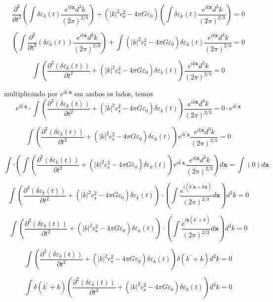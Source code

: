 \documentclass[a4paper,12pt]{article}
\begin{document}
$$\dfrac{\partial^2 }{\partial t^2} \left(\int \delta\varepsilon_k (t)  \dfrac{e^{ik\textbf{x}}d^3 k}{(2\pi)^{2/3}} \right) + (|k|^2c^2_s - 4\pi G\varepsilon_0)  \left(\int \delta\varepsilon_k (t)  \dfrac{e^{ik\textbf{x}}d^3 k}{(2\pi)^{2/3}} \right) = 0$$

$$ \left(\int \dfrac{\partial^2 }{\partial t^2}( \delta\varepsilon_k (t))  \dfrac{e^{ik\textbf{x}}d^3 k}{(2\pi)^{2/3}} \right) + \int (|k|^2c^2_s - 4\pi G\varepsilon_0)\delta\varepsilon_k (t) \dfrac{ e^{ik\textbf{x}}d^3 k}{(2\pi)^{2/3}} = 0$$

$$ \int \left(\dfrac{\partial^2 (\delta\varepsilon_k (t))}{\partial t^2} +(|k|^2c^2_s - 4\pi G\varepsilon_0)\delta\varepsilon_k (t)\right)  \dfrac{e^{ik\textbf{x}}d^3 k}{(2\pi)^{2/3}} = 0$$

multiplicando por $e^{i k^\prime \textbf{x}}$ em ambos os lados, temos
$$ e^{i k^\prime \textbf{x}} \cdot \int \left(\dfrac{\partial^2 (\delta\varepsilon_k (t))}{\partial t^2} +(|k|^2c^2_s - 4\pi G\varepsilon_0)\delta\varepsilon_k (t)\right)\dfrac{e^{ik\textbf{x}}d^3 k}{(2\pi)^{2/3}} = 0 \cdot  e^{i k^\prime \textbf{x}}$$

$$ \int \left(\dfrac{\partial^2 (\delta\varepsilon_k (t))}{\partial t^2} +(|k|^2c^2_s - 4\pi G\varepsilon_0)\delta\varepsilon_k (t)\right) e^{i k^\prime \textbf{x}}  \dfrac{e^{ik\textbf{x}}d^3 k}{(2\pi)^{2/3}} = 0$$

$$ \int \cdot \left(\int \left(\dfrac{\partial^2 (\delta\varepsilon_k (t))}{\partial t^2} +(|k|^2c^2_s - 4\pi G\varepsilon_0)\delta\varepsilon_k (t)\right) e^{i k^\prime \textbf{x}}  \dfrac{e^{ik\textbf{x}}d^3 k}{(2\pi)^{2/3}}\right) d\textbf{x} =\int \left( 0 \right) d\textbf{x}$$

$$  \int \left(\dfrac{\partial^2 (\delta\varepsilon_k (t))}{\partial t^2} +(|k|^2c^2_s - 4\pi G\varepsilon_0)\delta\varepsilon_k (t)\right)\cdot \left(\int \dfrac{e^{ i (k^\prime \textbf{x} +  k\textbf{x}) }}{(2\pi)^{2/3}}d\textbf{x}\right) d^3k   =0$$

$$ \int \left(\dfrac{\partial^2 (\delta\varepsilon_k (t))}{\partial t^2} +(|k|^2c^2_s - 4\pi G\varepsilon_0)\delta\varepsilon_k (t)\right) \cdot\left(\int  \dfrac{e^{ i \textbf{x}(k^\prime  + k) }}{(2\pi)^{2/3}}d\textbf{x} \right)d^3k  =0$$

$$  \int \left(\dfrac{\partial^2 (\delta\varepsilon_k (t))}{\partial t^2} +(|k|^2c^2_s - 4\pi G\varepsilon_0)\delta\varepsilon_k (t)\right) \delta (k^\prime + k) d^3k  =0$$

$$  \int \delta (k^\prime + k)\left(\dfrac{\partial^2 (\delta\varepsilon_k (t))}{\partial t^2} +(|k|^2c^2_s - 4\pi G\varepsilon_0)\delta\varepsilon_k (t)\right)  d^3k  =0$$
\end{document}
